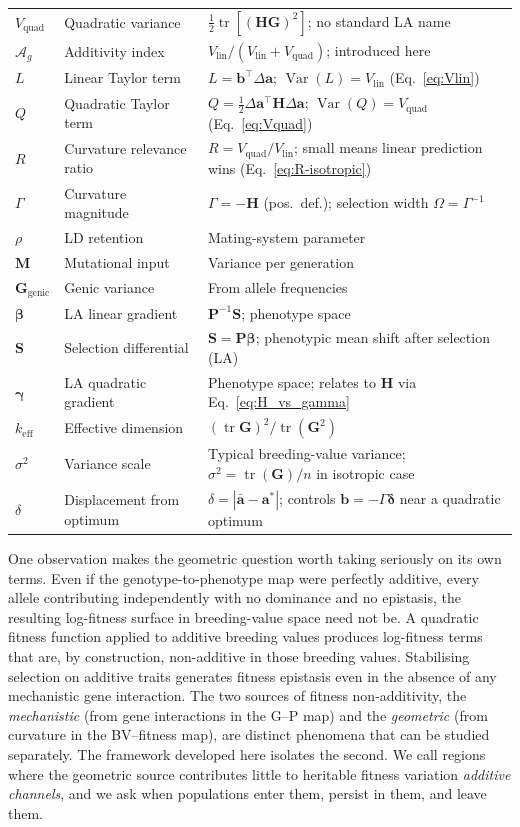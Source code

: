 \documentclass[9pt,twocolumn,twoside,lineno]{gsajnl}
\newcommand{\vect}[1]{\boldsymbol{#1}}
\newcommand{\mat}[1]{\mathbf{#1}}
\newcommand{\tr}{\ensuremath{\operatorname{tr}}\xspace}
\newcommand{\Ag}{\ensuremath{\mathcal{A}_{g}}\xspace}
\newcommand{\Ggenic}{\ensuremath{\mat{G}_{\text{genic}}}\xspace}
\newcommand{\Vlin}{\ensuremath{V_{\text{lin}}}\xspace}
\newcommand{\Vquad}{\ensuremath{V_{\text{quad}}}\xspace}
\newcommand{\keff}{\ensuremath{k_{\mathrm{eff}}}\xspace}
\newcommand{\Var}{\ensuremath{\operatorname{Var}}\xspace}
\begin{document}
\begin{table}[H]
\begin{tabular}{@{}l p{1.9cm} p{4.0cm}@{}}
$\Vquad$ & Quadratic variance & $\tfrac{1}{2}\tr[(\mat{H}\mat{G})^2]$; no standard LA name \\
$\Ag$ & Additivity index & $\Vlin/(\Vlin + \Vquad)$; introduced here \\
$L$ & Linear Taylor term & $L = \vect{b}^\top \Delta\vect{a}$; $\Var(L) = \Vlin$ (Eq.~\ref{eq:Vlin}) \\
$Q$ & Quadratic Taylor term & $Q = \tfrac{1}{2}\Delta\vect{a}^\top \mat{H} \Delta\vect{a}$; $\Var(Q) = \Vquad$ (Eq.~\ref{eq:Vquad}) \\
$R$ & Curvature relevance ratio & $R = \Vquad/\Vlin$; small means linear prediction wins (Eq.~\ref{eq:R-isotropic}) \\
$\Gamma$ & Curvature magnitude & $\Gamma = -\mat{H}$ (pos.\ def.); selection width $\Omega = \Gamma^{-1}$ \\
$\rho$ & LD retention & Mating-system parameter \\
$\mat{M}$ & Mutational input & Variance per generation \\
$\Ggenic$ & Genic variance & From allele frequencies \\
$\bm{\beta}$ & LA linear gradient & $\mat{P}^{-1}\vect{S}$; phenotype space \\
$\vect{S}$ & Selection differential & $\vect{S} = \mat{P}\bm{\beta}$; phenotypic mean shift after selection (LA) \\
$\bm{\gamma}$ & LA quadratic gradient & Phenotype space; relates to $\mat{H}$ via Eq.~\ref{eq:H_vs_gamma} \\
$\keff$ & Effective dimension & $(\tr \mat{G})^2 / \tr(\mat{G}^2)$ \\
$\sigma^2$ & Variance scale & Typical breeding-value variance; $\sigma^2 = \tr(\mat{G})/n$ in isotropic case \\
$\delta$ & Displacement from optimum & $\delta = |\bar{\vect{a}} - \vect{a}^*|$; controls $\vect{b} = -\Gamma\bm{\delta}$ near a quadratic optimum \\
\bottomrule
\end{tabular}
\end{table}

One observation makes the geometric question worth taking seriously on its own terms. Even if the genotype-to-phenotype map were perfectly additive, every allele contributing independently with no dominance and no epistasis, the resulting log-fitness surface in breeding-value space need not be. A quadratic fitness function applied to additive breeding values produces log-fitness terms that are, by construction, non-additive in those breeding values. Stabilising selection on additive traits generates fitness epistasis even in the absence of any mechanistic gene interaction. The two sources of fitness non-additivity, the \emph{mechanistic} (from gene interactions in the G--P map) and the \emph{geometric} (from curvature in the BV--fitness map), are distinct phenomena that can be studied separately. The framework developed here isolates the second. We call regions where the geometric source contributes little to heritable fitness variation \emph{additive channels}, and we ask when populations enter them, persist in them, and leave them.
\end{document}
